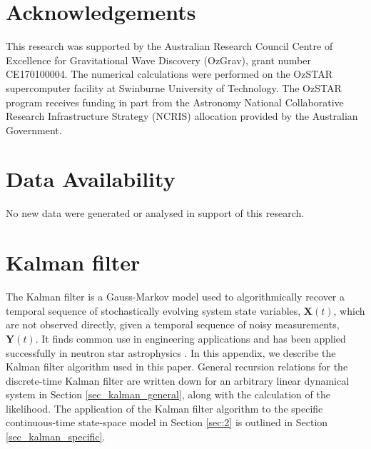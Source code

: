 \documentclass[fleqn,usenatbib,useAMS]{mnras}
\begin{document}
\section*{Acknowledgements}
This research was supported by the Australian Research Council Centre of Excellence for Gravitational Wave Discovery (OzGrav), grant number CE170100004. The numerical calculations were performed on the OzSTAR supercomputer facility at Swinburne University of Technology. The OzSTAR program receives funding in part from the Astronomy National Collaborative Research Infrastructure Strategy (NCRIS) allocation provided by the Australian Government.


\section*{Data Availability}
No new data were generated or analysed in support of this research.






\appendix
\newpage
\newpage
\clearpage


\section{Kalman filter} \label{sec:kalman}
The Kalman filter \citep{Kalman1} is a Gauss-Markov model used to algorithmically recover a temporal sequence of stochastically evolving  system state variables, $\boldsymbol{X}(t)$, which are not observed directly, given a temporal sequence of noisy measurements, $\boldsymbol{Y}(t)$. It finds common use in engineering applications and has been applied successfully in neutron star astrophysics \citep[e.g.][]{Myers2021MNRAS.502.3113M,Meyers2021,Melatos2023}. In this appendix, we describe the Kalman filter algorithm used in this paper. General recursion relations for the discrete-time Kalman filter are written down for an arbitrary linear dynamical system in Section \ref{sec_kalman_general}, along with the calculation of the likelihood. The application of the Kalman filter algorithm to the specific continuous-time state-space model in Section \ref{sec:2} is outlined in Section \ref{sec_kalman_specific}.

\end{document}
